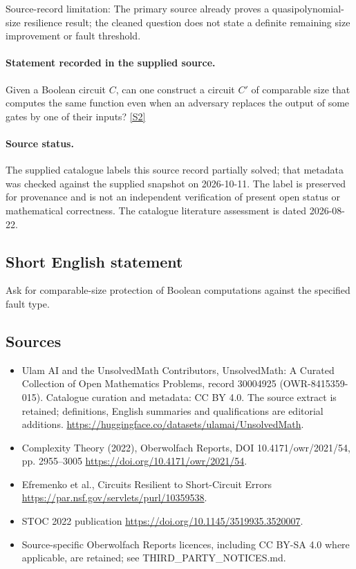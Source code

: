 \documentclass[11pt]{article}
\begin{document}
Source-record limitation: The primary source already proves a quasipolynomial-size resilience result; the cleaned question does not state a definite remaining size improvement or fault threshold.
\paragraph{Statement recorded in the supplied source.}
Given a Boolean circuit $C$, can one construct a circuit $C'$ of comparable size that computes the same function even when an adversary replaces the output of some gates by one of their inputs? \href{https://doi.org/10.4171/owr/2021/54}{[S2]}
\paragraph{Source status.}
The supplied catalogue labels this source record partially solved; that metadata was checked against the supplied snapshot on 2026-10-11. The label is preserved for provenance and is not an independent verification of present open status or mathematical correctness. The catalogue literature assessment is dated 2026-08-22.
\subsection{Short English statement}
Ask for comparable-size protection of Boolean computations against the specified fault type.
\subsection{Sources}
\begin{itemize}
\item[S1] Ulam AI and the UnsolvedMath Contributors, UnsolvedMath: A Curated Collection of Open Mathematics Problems, record 30004925 (OWR-8415359-015). Catalogue curation and metadata: CC BY 4.0. The source extract is retained; definitions, English summaries and qualifications are editorial additions.
\url{https://huggingface.co/datasets/ulamai/UnsolvedMath}.
\item[S2] Complexity Theory (2022), Oberwolfach Reports, DOI 10.4171/owr/2021/54, pp. 2955--3005
\url{https://doi.org/10.4171/owr/2021/54}.
\item[S3] Efremenko et al., Circuits Resilient to Short-Circuit Errors
\url{https://par.nsf.gov/servlets/purl/10359538}.
\item[S4] STOC 2022 publication
\url{https://doi.org/10.1145/3519935.3520007}.
\item Source-specific Oberwolfach Reports licences, including CC BY-SA 4.0 where applicable, are retained; see THIRD\_PARTY\_NOTICES.md.
\end{itemize}
\end{document}
